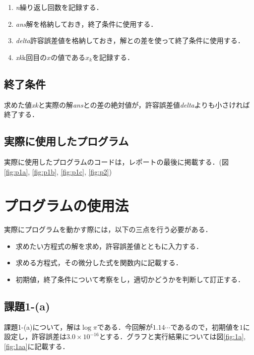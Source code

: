 \documentclass[12pt]{jarticle}
\begin{document}
\begin{enumerate}
\item \emph{n}\qquad 繰り返し回数を記録する．
\item \emph{ans}\qquad 解を格納しておき，終了条件に使用する．
\item \emph{delta}\qquad 許容誤差値を格納しておき，解との差を使って終了条件に使用する．
\item \emph{xk}\qquad k回目の$x$の値である$x_k$を記録する．
\end{enumerate}

\subsection{終了条件}

求めた値\emph{xk}と実際の解\emph{ans}との差の絶対値が，許容誤差値\emph{delta}よりも小さければ終了する．

\subsection{実際に使用したプログラム}

実際に使用したプログラムのコードは，レポートの最後に掲載する．(図\ref{fig:p1a}, \ref{fig:p1b}, \ref{fig:p1c}, \ref{fig:p2})



\section{プログラムの使用法}

実際にプログラムを動かす際には，以下の三点を行う必要がある．
\begin{itemize}
\item 求めたい方程式の解を求め，許容誤差値とともに入力する．
\item 求める方程式，その微分した式を関数内に記載する．
\item 初期値，終了条件について考察をし，適切かどうかを判断して訂正する．
\end{itemize}

\subsection{課題1-(a)}
課題1-(a)について，解は$\log\pi$である．今回解が$1.14\cdots$であるので，初期値を$1$に設定し，許容誤差は$3.0 \times 10^{-16}$とする．グラフと実行結果については図\ref{fig:1a}, \ref{fig:1aa}に記載する．
\end{document}
